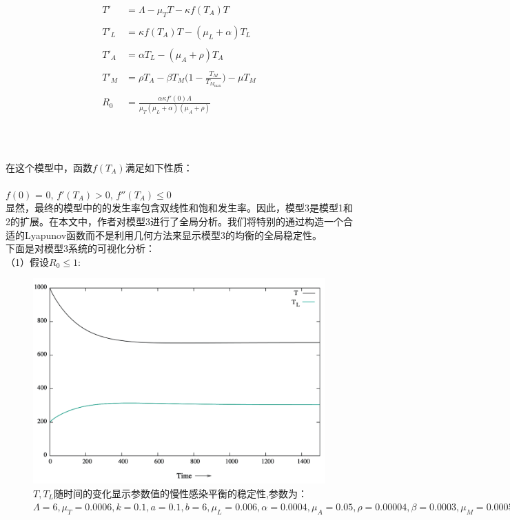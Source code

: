 \documentclass[12pt,a4paper]{article}
\begin{document}
{	\begin{equation}
	\begin{aligned}
	T'_{ } &= \Lambda-\mu_{T}T-\kappa f(T_{A}) T\\\\
	T'_{L} &= \kappa f(T_{A}) T - (\mu_{L} + \alpha)T_{L}\\\\
	T'_{A} &= \alpha T_{L} - (\mu_{A} + \rho)T_{A}\\\\
	T'_{M} &= \rho T_{A} - \beta T_{M} \Biggl( 1 - \frac{T_{M}}{T_{M_{\max}}} \Biggr)-\mu T_{M}\\\\
	R_{0} &= \frac{\alpha \kappa f'(0) \Lambda}{\mu_{T} (\mu_{L} + \alpha) (\mu_{A} + \rho) }\\\\
	\end{aligned}
	\end{equation}


	\noindent \\\\在这个模型中，函数$f(T_{A})$满足如下性质：\\\\
	$f(0)$ = 0, $f'(T_{A}) > 0$, $f''(T_{A}) \leq 0$\\

	显然，最终的模型中的的发生率包含双线性和饱和发生率。因此，模型3是模型1和2的扩展。在本文中，作者对模型3进行了全局分析。我们将特别的通过构造一个合适的Lyapunov函数而不是利用几何方法来显示模型3的均衡的全局稳定性。\\

	\noindent 下面是对模型3系统的可视化分析：\\
	（1）假设$R_0\leq1$:\\
	\begin{figure}[H]
		\centering
		\includegraphics[width=4.5in]{Snip20190310_4.png}
		\caption
		{$T,T_{L}$随时间的变化显示参数值的慢性感染平衡的稳定性,参数为：
		$\Lambda=6,\mu_{T}=0.0006,k=0.1, a=0.1,b=6,\mu_{L}=0.006,\alpha=0.0004,
		\mu_{A}=0.05,\rho=0.00004,\beta=0.0003,\mu_{M}=0.0005,T_{M_{max}}=2200$}
	\end{figure}

}
\end{document}
